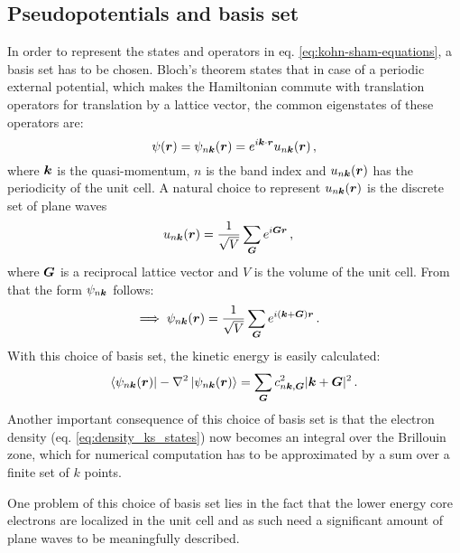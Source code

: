 \documentclass[main.tex]{subfiles}
\begin{document}
\subsection{Pseudopotentials and basis set}\label{sub:theory_basis_set}

In order to represent the states and operators in eq. \ref{eq:kohn-sham-equations}, a basis set has to be chosen.
Bloch's theorem states that in case of a periodic external potential, which makes the Hamiltonian commute with translation operators for translation by a lattice vector, the common eigenstates of these operators are:
\begin{equation}
    \psi (\vb*{r}) = \psi_{n \vb*{k}} (\vb*{r}) = e^{i \vb*{k} \cdot \vb*{r}} u_{n \vb*{k}} (\vb*{r})\,,
\end{equation}
where \(\vb*{k}\) is the quasi-momentum, \(n\) is the band index and \(u_{n \vb*{k}} (\vb*{r})\) has the periodicity of the unit cell.
A natural choice to represent \(u_{n \vb*{k}} (\vb*{r})\) is the discrete set of plane waves
\begin{align}
    u_{n \vb*{k}} (\vb*{r}) &= \frac{1}{\sqrt{V}} \sum_{\vb*{G}} e^{i \vb*{G} \vb*{r}}\,,
\end{align}
where \(\vb*{G}\) is a reciprocal lattice vector and \(V\) is the volume of the unit cell.
From that the form \(\psi_{n \vb*{k}}\) follows:
\begin{align}\label{}
    \implies \psi_{n \vb*{k}} (\vb*{r}) &= \frac{1}{\sqrt{V}} \sum_{\vb*{G}} e^{i (\vb*{k} + \vb*{G}) \vb*{r}}\,.
\end{align}
With this choice of basis set, the kinetic energy is easily calculated:
\begin{equation}
    \bra{\psi_{n \vb*{k}} (\vb*{r})} - \nabla^2 \ket{\psi_{n \vb*{k}} (\vb*{r})} = \sum_{\vb*{G}} c_{n \vb*{k}, \vb*{G}}^2 \vert \vb*{k} + \vb*{G} \vert^2\,.
\end{equation}
Another important consequence of this choice of basis set is that the electron density (eq. \ref{eq:density_ks_states}) now becomes an integral over the Brillouin zone, which for numerical computation has to be approximated by a sum over a finite set of \(k\) points. 

One problem of this choice of basis set lies in the fact that the lower energy core electrons are localized in the unit cell and as such need a significant amount of plane waves to be meaningfully described.
\end{document}
